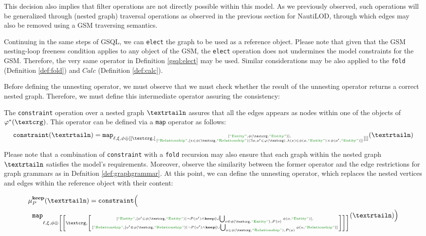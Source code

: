 This decision also implies that filter operations are not directly possible within this model. As we previously observed, such operations will be generalized through (nested graph) traversal operations as observed in the previous section for NautiLOD, through which edges may also be removed using a GSM traversing semantics. %


Continuing in the same steps of GSQL, we can \texttt{elect} the graph to be  used as a reference object. Please note that given that the GSM nesting-loop freeness condition applies to any object of the GSM, the \texttt{elect} operation does not undermines the model constraints for the GSM. Therefore, the very same operator in Definition \vref{gsql:elect} may be used. 
Similar considerations may be also applied to the \texttt{fold}  (Definition \vref{def:fold}) and $Calc$ (Definition \vref{def:calc}).

Before defining the unnesting operator, we must observe that we must check whether the result of the unnesting operator returns a correct nested graph. Therefore, we must define this intermediate operator assuring the consistency:

\begin{definition}
	The \texttt{constraint} operation over a nested graph $\nested$ assures that all the edges appears as nodes within one of the objects of $\varphi^*(\ngraph)$. This operator can be defined via a \texttt{map} operator as follows:
	\[\texttt{constraint}(\nested)=\texttt{map}_{\ell,\xi,\phi\oplus [[\ngraph,[\genfrac{}{}{0pt}{}{[\ONTA,\phi(\ngraph,\ONTA)],}{[\RELA,[e\in\phi(\ngraph,\RELA)|\exists o,o'\in \varphi(\ngraph).\lambda(e)\in\phi(o,\ONTA)\times\phi(o',\ONTA) ]]}]]]}(\nested)\]
\end{definition}

Please note that a combination of \texttt{constraint} with a \texttt{fold} recursion may also ensure that each graph within the nested graph $\nested$ satisfies the model's requirements. Moreover, observe the similarity between the former operator and the edge restrictions for graph grammars as in Defnition \vref{def:graphgrammar}. At this point, we can define the unnesting operator, which replaces the nested vertices and edges within the reference object with their content:

\[\begin{split}
{\mu}&{}_{P}^{\textbf{keep}}(\nested)=\texttt{constraint}\Big(\\
&\texttt{map}_{\ell,\xi,\phi\oplus \left[\left[\ngraph,\left[\genfrac{}{}{0pt}{}{[\ONTA,[o'\in\phi(\ngraph,\ONTA)|\neg P(o')\wedge \textbf{keep}]\cup\bigcup_{o\in\phi(\ngraph,\ONTA),P(o)}\phi(o,\ONTA)],}{[\RELA,[o'\in\phi(\ngraph,\RELA)|\neg P(o')\wedge \textbf{keep}]\cup\bigcup_{o\in\phi(\ngraph,\RELA),P(o)}\phi(o,\RELA)]}\right]\right]\right]}(\nested)\Big)\\
\end{split}\]

